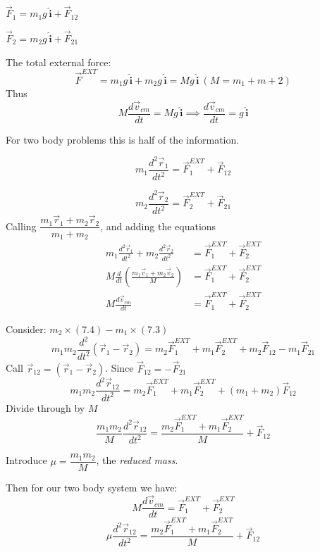 \documentclass[twoside]{scrartcl}
\let\oldhat\hat
\renewcommand{\hat}[1]{\,\oldhat{\boldsymbol{\mathbf{#1}}}}
\begin{document}
$\vec{F}_1 = m_1g \hat{i} + \vec{F}_{12}$

$\vec{F}_2 = m_2g \hat{i} + \vec{F}_{21}$

The total external force:
\[\vec{F}^{EXT} = m_1g\hat{i} + m_2g\hat{i} = Mg\hat{i} ~(M = m_1 + m+2)\]
Thus
\[M\frac{d\vec{v}_{cm}}{dt} = Mg\hat{i} \implies \frac{d\vec{v}_{cm}}{dt} = g\hat{i}\]

For two body problems this is half of the information.

\begin{equation}
m_1\frac{d^2\vec{r}_1}{dt^2} = \vec{F}_1^{EXT} + \vec{F}_{12}	
\end{equation}

\begin{equation}
m_2\frac{d^2\vec{r}_2}{dt^2} = \vec{F}_2^{EXT} + \vec{F}_{21}	
\end{equation}
Calling $\dfrac{m_1\vec{r}_1 + m_2\vec{r}_2}{m_1 + m_2}$, and adding the equations
\setlength{\jot}{10pt}
\[\begin{aligned}m_1\frac{d^2\vec{r}_1}{dt^2} + m_2\frac{d^2\vec{r}_2}{dt^2} &= \vec{F}_1^{EXT} + \vec{F}_{2}^{EXT}\\
M \frac{d}{dt}\left(\frac{m_1\vec{v}_1 + m_2\vec{v}_2}{M}\right) &=  \vec{F}_1^{EXT} + \vec{F}_{2}^{EXT}\\
M\frac{d\vec{v}_{cm}}{dt} &=  \vec{F}_1^{EXT} + \vec{F}_{2}^{EXT}
\end{aligned}\]

Consider: $m_2 \times (7.4) - m_1\times(7.3)$
\[m_1m_2\frac{d^2}{dt^2}(\vec{r}_1-\vec{r}_2) = m_2\vec{F}_1^{EXT} + m_1\vec{F}_2^{EXT} + m_2\vec{F}_{12} - m_1\vec{F}_{21}\]
Call $\vec{r}_{12} = (\vec{r}_1 - \vec{r}_2)$. Since $\vec{F}_{12} = -\vec{F}_{21}$
\[m_1m_2\frac{d^2\vec{r}_{12}}{dt^2} = m_2\vec{F}_1^{EXT} + m_1\vec{F}_2^{EXT} + (m_1 + m_2)\vec{F}_{12}\]
Divide through by $M$
\[\frac{m_1m_2}{M}\frac{d^2\vec{r}_{12}}{dt^2} = \frac{m_2\vec{F}_1^{EXT} + m_1\vec{F}_2^{EXT}}{M} + \vec{F}_{12}\]
\begin{definition} Introduce $\mu = \dfrac{m_1m_2}{M}$, the \emph{reduced mass}.
\end{definition}
Then for our two body system we have:
\begin{equation}
M\frac{d\vec{v}_{cm}}{dt} =  \vec{F}_1^{EXT} + \vec{F}_{2}^{EXT}
\end{equation}
\begin{equation}
\mu\frac{d^2\vec{r}_{12}}{dt^2} = \frac{m_2\vec{F}_1^{EXT} + m_1\vec{F}_2^{EXT}}{M} + \vec{F}_{12}
\end{equation}~
\end{document}
